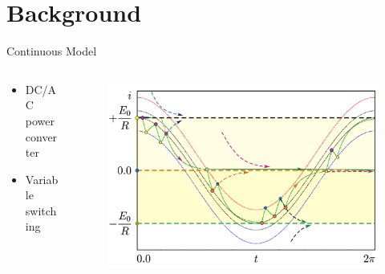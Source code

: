 \section{Background}

\begin{frame}{Continuous Model}
	\vspace{-1em}
	\begin{columns}
		\begin{column}{.4 \textwidth}
			\begin{itemize}
				\item DC/AC power converter
				\item Variable switching
			\end{itemize}
		\end{column}
		\begin{column}{.6 \textwidth}
			\begin{figure}
				\includegraphics[width=0.8 \textwidth]{Figs/continuous_model.png}
			\end{figure}

			\flushright{[Zhusubaliyev]}
		\end{column}
	\end{columns}
\end{frame}

